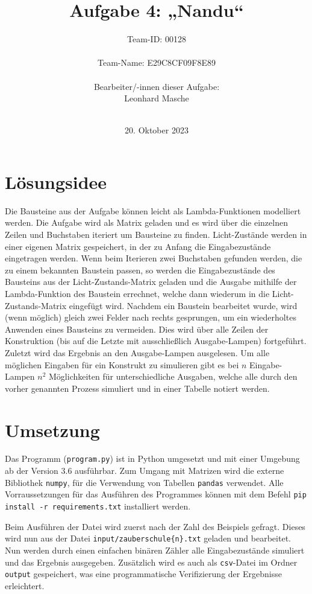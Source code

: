 \documentclass[a4paper,12pt]{scrartcl}
\title{\textbf{\Huge Aufgabe 4: „Nandu“}}
\author{\LARGE Team-ID: \LARGE 00128 \\\\
	    \LARGE Team-Name: \LARGE E29C8CF09F8E89 \\\\
	    \LARGE Bearbeiter/-innen dieser Aufgabe: \\ 
	    \LARGE Leonhard Masche\\\\}
\date{\LARGE20. Oktober 2023}
\theoremstyle{definition}
\begin{document}
\maketitle
\tableofcontents
\section{Lösungsidee}

Die Bausteine aus der Aufgabe können leicht als Lambda-Funktionen modelliert
werden. Die Aufgabe wird als Matrix geladen und es wird über die einzelnen Zeilen
und Buchstaben iteriert um Bausteine zu finden. Licht-Zustände werden in einer
eigenen Matrix gespeichert, in der zu Anfang die Eingabezustände eingetragen
werden. Wenn beim Iterieren zwei Buchstaben gefunden werden, die zu einem
bekannten Baustein passen, so werden die Eingabezustände des Bausteins aus der
Licht-Zustands-Matrix geladen und die Ausgabe mithilfe der Lambda-Funktion des
Baustein errechnet, welche dann wiederum in die Licht-Zustands-Matrix eingefügt
wird. Nachdem ein Baustein bearbeitet wurde, wird (wenn möglich) gleich zwei
Felder nach rechts gesprungen, um ein wiederholtes Anwenden eines Bausteins zu
vermeiden. Dies wird über alle Zeilen der Konstruktion (bis auf die Letzte mit
ausschließlich Ausgabe-Lampen) fortgeführt. Zuletzt wird das Ergebnis an den
Ausgabe-Lampen ausgelesen. Um alle möglichen Eingaben für ein Konstrukt zu
simulieren gibt es bei $n$ Eingabe-Lampen $n^2$ Möglichkeiten für
unterschiedliche Ausgaben, welche alle durch den vorher genannten Prozess
simuliert und in einer Tabelle notiert werden.


\section{Umsetzung}

Das Programm (\texttt{program.py}) ist in Python umgesetzt und mit einer Umgebung ab
der Version 3.6 ausführbar. Zum Umgang mit Matrizen wird die externe
Bibliothek \texttt{numpy}, für die Verwendung von Tabellen \texttt{pandas} verwendet. Alle
Vorraussetzungen für das Ausführen des Programmes können mit dem Befehl \texttt{pip
	install -r requirements.txt} installiert werden.

Beim Ausführen der Datei wird zuerst nach der Zahl des Beispiels gefragt. Dieses
wird nun aus der Datei \texttt{input/zauberschule\{n\}.txt} geladen und bearbeitet. Nun
werden durch einen einfachen binären Zähler alle Eingabezustände simuliert und
das Ergebnis ausgegeben. Zusätzlich wird es auch als \texttt{csv}-Datei im Ordner
\texttt{output} gespeichert, was eine programmatische Verifizierung der Ergebnisse
erleichtert.
\end{document}

